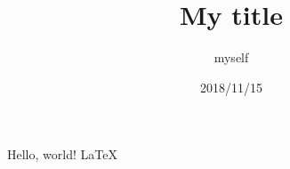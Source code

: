 \documentclass{article}
\title{My title}
\author{myself}
\date{2018/11/15}
\begin{document}
    \maketitle

    \newpage
    Hello, world!
    LaTeX
\end{document}
